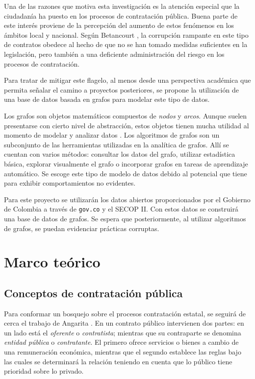 \documentclass[11pt,letterpaper,oneside]{article}
\begin{document}
Una de las razones que motiva esta investigación es la atención especial que la ciudadanía ha puesto en los procesos de contratación pública. Buena parte de este interés proviene de la percepción del aumento de estos fenómenos en los ámbitos local y nacional. Según Betancourt \cite{Betancourt-2018}, la corrupción rampante en este tipo de contratos obedece al hecho de que no se han tomado medidas suficientes en la legislación, pero también a una deficiente administración del riesgo en los procesos de contratación.

Para tratar de mitigar este flagelo, al menos desde una perspectiva académica que permita señalar el camino a proyectos posteriores, se propone la utilización de una base de datos basada en grafos para modelar este tipo de datos.

Los grafos son objetos matemáticos compuestos de {\em nodos} y {\em arcos}. Aunque suelen presentarse con cierto nivel de abstracción, estos objetos tienen mucha utilidad al momento de modelar y analizar datos \cite{Needham-2019}. Los algoritmos de grafos son un subconjunto de las herramientas utilizadas en la analítica de grafos. Allí se cuentan con varios métodos: consultar los datos del grafo, utilizar estadística básica, explorar visualmente el grafo o incorporar grafos en tareas de aprendizaje automático. Se escoge este tipo de modelo de datos debido al potencial que tiene para exhibir comportamientos no evidentes.

Para este proyecto se utilizarán los datos abiertos proporcionados por el Gobierno de Colombia a través de \texttt{gov.co}  y el SECOP II. Con estos datos se construirá una base de datos de grafos. Se espera que posteriormente, al utilizar algoritmos de grafos, se puedan evidenciar prácticas corruptas.

\section{Marco teórico}
\subsection{Conceptos de contratación pública}
Para conformar un bosquejo sobre el procesos contratación estatal, se seguirá de cerca el trabajo de Angarita \cite{Angarita-2018}. En un contrato público intervienen dos partes: en un lado está el {\em oferente} o {\em contratista}; mientras que su contraparte se denomina {\em entidad pública} o {\em contratante}. El primero ofrece servicios o bienes a cambio de una remuneración económica, mientras que el segundo establece las reglas bajo las cuales se determinará la relación teniendo en cuenta que lo público tiene prioridad sobre lo privado.
\end{document}
